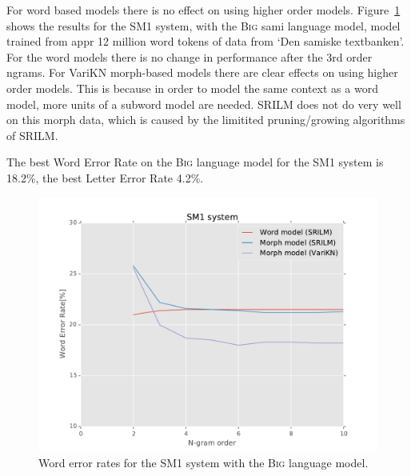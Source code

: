 \documentclass[b5paper]{article}
\newcommand{\ds}[1]{\textsc{#1}}
\begin{document}
For word based models there is no effect on using higher order models. Figure~\ref{fig:samiperf} shows the results for the SM1 system, with the \ds{Big} sami language model, model trained from appr 12 million word tokens of data from `Den samiske textbanken'. For the word models there is no change in performance after the 3rd order ngrams. For VariKN morph-based models there are clear effects on using higher order models. This is because in order to model the same context as a word model, more units of a subword model are needed. SRILM does not do very well on this morph data, which is caused by the limitited pruning/growing algorithms of SRILM.

The best Word Error Rate on the \ds{Big} language model for the SM1 system is 18.2\%, the best Letter Error Rate 4.2\%. 

\begin{figure}[!h]
\centering
\includegraphics[width=\textwidth]{figures/sme1}
\caption{Word error rates for the SM1 system with the \ds{Big} language model.}\label{fig:samiperf}

\end{figure}



\end{document}
